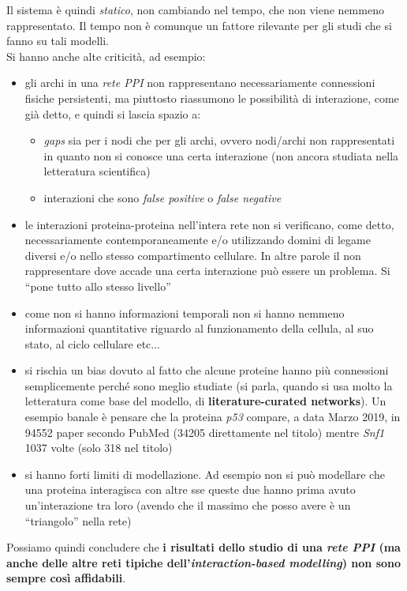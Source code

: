 \documentclass[a4paper,12pt, oneside]{book}
\begin{document}
Il sistema è quindi \textit{statico}, non cambiando nel tempo, che non viene
nemmeno rappresentato. Il tempo non è comunque un fattore rilevante per gli
studi che si fanno su tali modelli. \\
Si hanno anche alte criticità, ad esempio:
\begin{itemize}
  \item gli archi in una \textit{rete PPI} non rappresentano necessariamente
  connessioni fisiche persistenti, ma piuttosto riassumono le possibilità di
  interazione, come già detto, e quindi si lascia spazio a:
  \begin{itemize}
    \item \textit{gaps} sia per i nodi che per gli archi, ovvero nodi/archi non
    rappresentati in quanto non si conosce una certa interazione (non ancora
    studiata nella letteratura scientifica)
    \item interazioni che sono \textit{false positive} o \textit{false negative}
  \end{itemize}
  \item le interazioni proteina-proteina nell'intera rete non si verificano,
  come detto,
  necessariamente contemporaneamente e/o utilizzando domini di legame diversi
  e/o nello stesso compartimento cellulare. In altre parole il non rappresentare
  dove accade una certa interazione può essere un problema. Si ``pone tutto allo
  stesso livello''
  \item come non si hanno informazioni temporali non si hanno nemmeno
  informazioni quantitative riguardo al funzionamento della cellula, al suo
  stato, al ciclo cellulare etc$\ldots$
  \item si rischia un bias dovuto al fatto che alcune proteine hanno più
  connessioni semplicemente perché sono meglio studiate (si parla, quando si usa
  molto la letteratura come base del modello, di \textbf{literature-curated
    networks}). Un esempio banale è pensare che la proteina \textit{p53}
  compare, a data Marzo 2019, in 94552 paper secondo PubMed (34205 direttamente
  nel titolo) mentre \textit{Snf1} 1037 volte (solo 318 nel titolo)
  \item si hanno forti limiti di modellazione. Ad esempio non si può modellare
  che una proteina interagisca con altre sse queste due hanno prima avuto
  un'interazione tra loro (avendo che il massimo che posso avere è un
  ``triangolo'' nella rete)
\end{itemize}
Possiamo quindi concludere che \textbf{i risultati dello studio di una
  \textit{rete PPI} (ma anche delle altre reti tipiche
  dell'\textit{interaction-based modelling}) non sono sempre così affidabili}.
\end{document}
